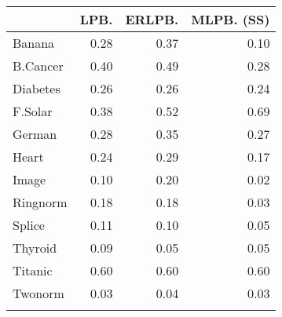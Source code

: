\begin{tabular}{lrrr}
    \toprule
	         &       LPB. &     ERLPB. & MLPB. (SS) \\ \midrule \addlinespace[0.5em]
	Banana   &       0.28 &       0.37 &       0.10 \\          \addlinespace[0.5em]
	B.Cancer &       0.40 &       0.49 &       0.28 \\          \addlinespace[0.5em]
	Diabetes &       0.26 &       0.26 &       0.24 \\          \addlinespace[0.5em]
	F.Solar  &       0.38 &       0.52 &       0.69 \\          \addlinespace[0.5em]
	German   &       0.28 &       0.35 &       0.27 \\          \addlinespace[0.5em]
	Heart    &       0.24 &       0.29 &       0.17 \\          \addlinespace[0.5em]
	Image    &       0.10 &       0.20 &       0.02 \\          \addlinespace[0.5em]
	Ringnorm &       0.18 &       0.18 &       0.03 \\          \addlinespace[0.5em]
	Splice   &       0.11 &       0.10 &       0.05 \\          \addlinespace[0.5em]
	Thyroid  &       0.09 &       0.05 &       0.05 \\          \addlinespace[0.5em]
	Titanic  &       0.60 &       0.60 &       0.60 \\          \addlinespace[0.5em]
	Twonorm  &       0.03 &       0.04 &       0.03 \\          \addlinespace[0.5em]
    \bottomrule
\end{tabular}